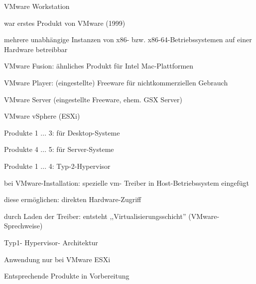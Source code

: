 \documentclass[a4paper]{article}
\begin{document}
\begin{multicols}{3}
\begin{itemize*}
\begin{enumerate*}
            \item VMware Workstation \begin{itemize*} \item war erstes Produkt von VMware (1999) \item mehrere unabhängige Instanzen von x86- bzw. x86-64-Betriebssystemen auf einer Hardware betreibbar \end{itemize*}
            \item VMware Fusion: ähnliches Produkt für Intel Mac-Plattformen
            \item VMware Player: (eingestellte) Freeware für nichtkommerziellen Gebrauch
            \item VMware Server (eingestellte Freeware, ehem. GSX Server)
            \item VMware vSphere (ESXi) \begin{itemize*} \item Produkte 1 ... 3: für Desktop-Systeme \item Produkte 4 ... 5: für Server-Systeme \item Produkte 1 ... 4: Typ-2-Hypervisor \end{itemize*}
        \end{enumerate*}
        \item
        bei VMware-Installation: spezielle vm- Treiber in Host-Betriebssystem
        eingefügt
        \item
        diese ermöglichen: direkten Hardware-Zugriff
        \item
        durch Laden der Treiber: entsteht ,,Virtualisierungsschicht''
        (VMware-Sprechweise)
        \begin{itemize*}
            \item Typ1- Hypervisor- Architektur
            \item Anwendung nur bei VMware ESXi
        \end{itemize*}
        \begin{itemize*}
            \item Entsprechende Produkte in Vorbereitung
        \end{itemize*}
    \end{itemize*}



\end{multicols}
\end{document}
